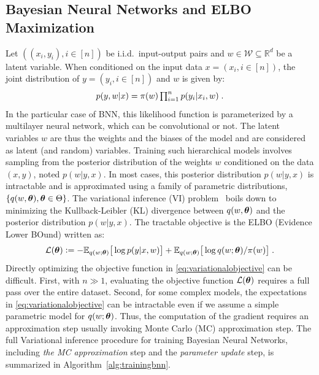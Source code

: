 \documentclass[tablecaption=bottom,wcp]{jmlr} %
\begin{document}
\subsection{Bayesian Neural Networks and ELBO Maximization}
Let $((x_i,y_i), i \in [n])$ be i.i.d.~input-output pairs and $w \in \mathcal{W} \subseteq \mathbb{R}^{d}$ be a latent variable. When conditioned on the input data $x = (x_i, i \in [n])$, the joint distribution of $y = (y_i, i \in [n])$ and $w$ is given by:
\begin{equation}\label{eq:vi} \textstyle
    p(y,w | x) = \prior(w)\prod_{i=1}^{n}{p(y_i | x_i, w)} \eqsp.
\end{equation}
In the particular case of BNN, this likelihood function is parameterized by a multilayer neural network, which can be convolutional or not.
The latent variables $w$ are thus the weights and the biases of the model and are considered as latent (and random) variables.
Training such hierarchical models involves sampling from the posterior distribution of the weights $w$ conditioned on the data $(x,y)$, noted $p(w|y,x)$.
In most cases, this posterior distribution $p(w|y,x)$ is intractable and is approximated using a family of parametric distributions, $\{q(w, \param ), \param \in \Param \}$. 
The variational inference (VI) problem~\citep{blei2017variational} boils down to minimizing the Kullback-Leibler (KL) divergence between $q(w, \param )$ and the posterior distribution $p(w|y,x)$. 
The tractable objective is the ELBO (Evidence Lower BOund) written as:
\begin{equation}\label{eq:variationalobjective}
{\cal L}(\param) \eqdef -\EE_{ q( w; \param )} \big[\log p(y | x, w) \big]+  \EE_{ q( w; \param )} \big[ \log q(w; \param )/\prior(w) \big]  \eqsp.
\end{equation}
Directly optimizing the objective function in \eqref{eq:variationalobjective} can be difficult.
First, with $n \gg 1$, evaluating the objective function ${\cal L}( \param )$ requires a full pass over the entire dataset.
Second, for some complex models, the expectations in \eqref{eq:variationalobjective} can be intractable even if we assume a simple parametric model for $q(w; \param)$.
Thus, the computation of the gradient requires an approximation step usually invoking Monte Carlo (MC) approximation step. 
The full Variational inference procedure for training Bayesian Neural Networks, including \textit{the MC approximation} step and the \textit{parameter update} step, is summarized in Algorithm~\ref{alg:trainingbnn}.
\end{document}
